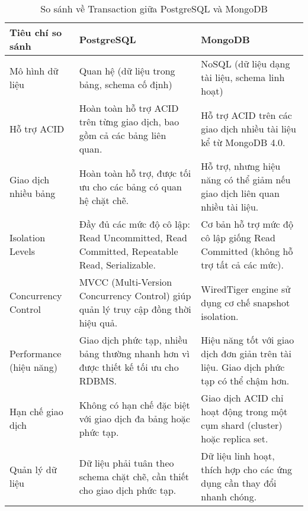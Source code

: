\begin{table}[H]
    \centering
    \begin{tabular}{|L{3.2cm}|L{5.05cm}|L{5.05cm}|} \hline 
         \textbf{Tiêu chí so sánh }&  \textbf{PostgreSQL}&  \textbf{MongoDB}\\ \hline 
         Mô hình dữ liệu & Quan hệ (dữ liệu trong bảng, schema cố định) & NoSQL (dữ liệu dạng tài liệu, schema linh hoạt)\\ \hline 
         Hỗ trợ ACID & Hoàn toàn hỗ trợ ACID trên từng giao dịch, bao gồm cả các bảng liên quan. & Hỗ trợ ACID trên các giao dịch nhiều tài liệu kể từ MongoDB 4.0.\\ \hline
         Giao dịch nhiều bảng & Hoàn toàn hỗ trợ, được tối ưu cho các bảng có quan hệ chặt chẽ. & Hỗ trợ, nhưng hiệu năng có thể giảm nếu giao dịch liên quan nhiều tài liệu.\\ \hline
         Isolation Levels & Đầy đủ các mức độ cô lập: Read Uncommitted, Read Committed, Repeatable Read, Serializable. & Cơ bản hỗ trợ mức độ cô lập giống Read Committed (không hỗ trợ tất cả các mức).\\ \hline
         Concurrency Control & MVCC (Multi-Version Concurrency Control) giúp quản lý truy cập đồng thời hiệu quả. & WiredTiger engine sử dụng cơ chế snapshot isolation.\\ \hline
         Performance (hiệu năng) & Giao dịch phức tạp, nhiều bảng thường nhanh hơn vì được thiết kế tối ưu cho RDBMS. & Hiệu năng tốt với giao dịch đơn giản trên tài liệu. Giao dịch phức tạp có thể chậm hơn.\\ \hline
         Hạn chế giao dịch & Không có hạn chế đặc biệt với giao dịch đa bảng hoặc phức tạp. & Giao dịch ACID chỉ hoạt động trong một cụm shard (cluster) hoặc replica set.\\ \hline
         Quản lý dữ liệu & Dữ liệu phải tuân theo schema chặt chẽ, cần thiết cho giao dịch phức tạp. & Dữ liệu linh hoạt, thích hợp cho các ứng dụng cần thay đổi nhanh chóng.\\ \hline
    \end{tabular}
    \caption{So sánh về Transaction giữa PostgreSQL và MongoDB}
    \label{tab:transaction}
\end{table}
\newpage